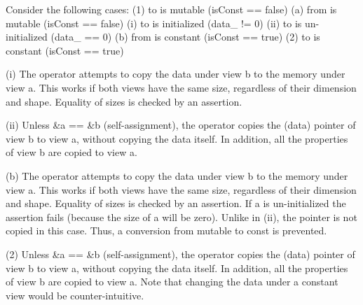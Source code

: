 Consider the following cases\+: (1) \textquotesingle{}to\textquotesingle{} is mutable (is\+Const == false) (a) \textquotesingle{}from\textquotesingle{} is mutable (is\+Const == false) (i) \textquotesingle{}to\textquotesingle{} is initialized (data\+\_\+ != 0) (ii) \textquotesingle{}to\textquotesingle{} is un-\/initialized (data\+\_\+ == 0) (b) \textquotesingle{}from\textquotesingle{} is constant (is\+Const == true) (2) \textquotesingle{}to\textquotesingle{} is constant (is\+Const == true)

(i) The operator attempts to copy the data under view \textquotesingle{}b\textquotesingle{} to the memory under view \textquotesingle{}a\textquotesingle{}. This works if both views have the same size, regardless of their dimension and shape. Equality of sizes is checked by an assertion.

(ii) Unless \&a == \&b (self-\/assignment), the operator copies the (data) pointer of view \textquotesingle{}b\textquotesingle{} to view \textquotesingle{}a\textquotesingle{}, without copying the data itself. In addition, all the properties of view \textquotesingle{}b\textquotesingle{} are copied to view \textquotesingle{}a\textquotesingle{}.

(b) The operator attempts to copy the data under view \textquotesingle{}b\textquotesingle{} to the memory under view \textquotesingle{}a\textquotesingle{}. This works if both views have the same size, regardless of their dimension and shape. Equality of sizes is checked by an assertion. If \textquotesingle{}a\textquotesingle{} is un-\/initialized the assertion fails (because the size of a will be zero). Unlike in (ii), the pointer is not copied in this case. Thus, a conversion from mutable to const is prevented.

(2) Unless \&a == \&b (self-\/assignment), the operator copies the (data) pointer of view \textquotesingle{}b\textquotesingle{} to view \textquotesingle{}a\textquotesingle{}, without copying the data itself. In addition, all the properties of view \textquotesingle{}b\textquotesingle{} are copied to view \textquotesingle{}a\textquotesingle{}. Note that changing the data under a constant view would be counter-\/intuitive. \mbox{\label{classandres_1_1View_a24aacc568e0bd3a5c69fe1d9550d03f7}} 
